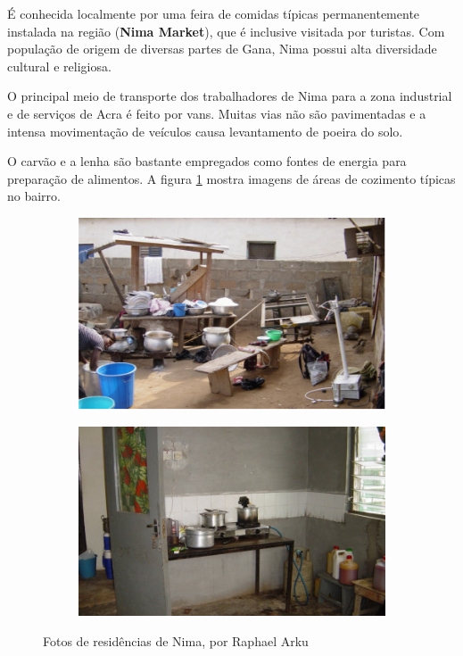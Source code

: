 É conhecida localmente por uma feira de comidas típicas permanentemente 
instalada na região (\textbf{Nima Market}), que é inclusive visitada por turistas.
Com população de origem de diversas partes de Gana, Nima possui 
alta diversidade cultural e religiosa.

O principal meio de transporte dos trabalhadores de Nima para a zona industrial
e de serviços de Acra é feito por vans. 
Muitas vias não são pavimentadas e a intensa movimentação de veículos causa 
levantamento de poeira do solo.

O carvão e a lenha são bastante empregados como fontes de energia para preparação de 
alimentos. A figura \ref{fig:nima} mostra imagens de áreas de cozimento típicas no bairro.

\begin{figure}[H]
  \begin{subfigure}[b]{0.5\textwidth}
    \includegraphics[width=\textwidth]{../inputs/images/zheng/nima1.jpg}
    \caption{}
  \end{subfigure}%
  \begin{subfigure}[b]{0.5\textwidth}
    \includegraphics[width=\textwidth]{../inputs/images/zheng/nima2.jpg}
    \caption{}
  \end{subfigure}
  \caption{Fotos de residências de Nima, por Raphael Arku \label{fig:nima}}
\end{figure}
